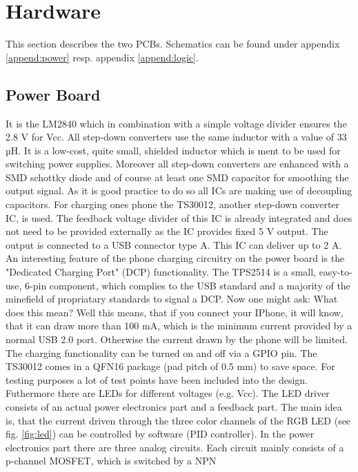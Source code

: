 \section{Hardware}
\label{sec:hardware}
This section describes the two PCBs. Schematics can be found under appendix
\ref{append:power} resp. appendix \ref{append:logic}.

\subsection{Power Board}
\label{subsec:power}
It is the LM2840 which in combination with a simple voltage divider ensures the
2.8 V for Vcc. All step-down converters use the same inductor with a value of 33
µH. It is a low-cost, quite small, shielded inductor which is ment to be used
for switching power supplies. Moreover all step-down converters are enhanced
with a SMD schottky diode and of course at least one SMD capacitor for
smoothing the output signal. As it is good practice to do so all ICs are making
use of decoupling capacitors.  
\newpar
For charging ones phone the TS30012, another step-down converter IC, is used.
The feedback voltage divider of this IC is already integrated and does not need
to be provided externally as the IC provides fixed 5 V output. The output is
connected to a USB connector type A. This IC can deliver up to 2 A. An
interesting feature of the phone charging circuitry on the power board is the
"Dedicated Charging Port" (DCP) functionality. The TPS2514 is a small,
easy-to-use, 6-pin component, which complies to the USB standard and a majority
of the minefield of propriatary standards to signal a DCP. Now one might ask:
What does this mean? Well this means, that if you connect your IPhone, it will
know, that it can draw more than 100 mA, which is the minimum current provided
by a normal USB 2.0 port. Otherwise the current drawn by the phone will be
limited. The charging functionality can be turned on and off via a GPIO pin. The
TS30012 comes in a QFN16 package (pad pitch of 0.5 mm) to save space.
\newpar
For testing purposes a lot of test points have been included into the design.
Futhermore there are LEDs for different voltages (e.g. Vcc).
\newpar
The LED driver consists of an actual power electronics part and a feedback part.
The main idea is, that the current driven through the three color channels of
the RGB LED (see fig. \ref{fig:led}) can be controlled by software (PID
controller). In the power electronics part there are three analog circuits. Each
circuit mainly consists of a p-channel MOSFET, which is switched by a NPN
